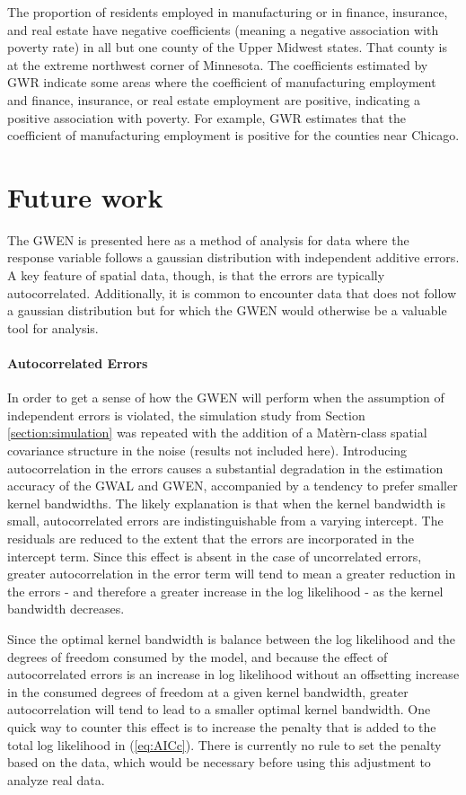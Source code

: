 \documentclass[authoryear, review, 11pt]{elsarticle}
\begin{document}
    The proportion of residents employed in manufacturing or in finance, insurance, and real estate have negative coefficients (meaning a negative association with poverty rate) in all but one county of the Upper Midwest states. That county is at the extreme northwest corner of Minnesota. The coefficients estimated by GWR indicate some areas where the coefficient of manufacturing employment and finance, insurance, or real estate employment are positive, indicating a positive association with poverty. For example, GWR estimates that the coefficient of manufacturing employment is positive for the counties near Chicago.

\section{Future work \label{section:future-work}}
	The GWEN is presented here as a method of analysis for data where the response variable follows a gaussian distribution with independent additive errors. A key feature of spatial data, though, is that the errors are typically autocorrelated. Additionally, it is common to encounter data that does not follow a gaussian distribution but for which the GWEN would otherwise be a valuable tool for analysis.

	\paragraph{Autocorrelated Errors} In order to get a sense of how the GWEN will perform when the assumption of independent errors is violated, the simulation study from Section \ref{section:simulation} was repeated with the addition of a Mat\`{e}rn-class spatial covariance structure in the noise (results not included here). Introducing autocorrelation in the errors causes a substantial degradation in the estimation accuracy of the GWAL and GWEN, accompanied by a tendency to prefer smaller kernel bandwidths. The likely explanation is that when the kernel bandwidth is small, autocorrelated errors are indistinguishable from a varying intercept. The residuals are reduced to the extent that the errors are incorporated in the intercept term. Since this effect is absent in the case of uncorrelated errors, greater autocorrelation in the error term will tend to mean a greater reduction in the errors - and therefore a greater increase in the log likelihood - as the kernel bandwidth decreases.
	
	Since the optimal kernel bandwidth is balance between the log likelihood and the degrees of freedom consumed by the model, and because the effect of autocorrelated errors is an increase in log likelihood without an offsetting increase in the consumed degrees of freedom at a given kernel bandwidth, greater autocorrelation will tend to lead to a smaller optimal kernel bandwidth. One quick way to counter this effect is to increase the penalty that is added to the total log likelihood in (\ref{eq:AICc}). There is currently no rule to set the penalty based on the data, which would be necessary before using this adjustment to analyze real data.
	
\end{document}
